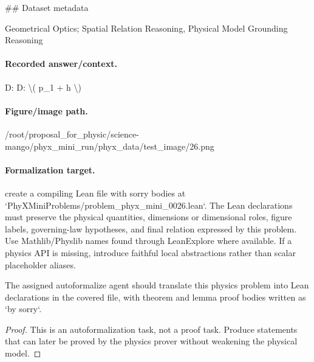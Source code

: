 \#\# Dataset metadata

Geometrical Optics; Spatial Relation Reasoning, Physical Model Grounding Reasoning

\paragraph{Recorded answer/context.}
D: D: \textbackslash{}( p\_1 + h \textbackslash{})

\paragraph{Figure/image path.}
/root/proposal\_for\_physic/science-mango/phyx\_mini\_run/phyx\_data/test\_image/26.png

\paragraph{Formalization target.}
create a compiling Lean file with sorry bodies at `PhyXMiniProblems/problem\_phyx\_mini\_0026.lean`. The Lean declarations must preserve the physical quantities, dimensions or dimensional roles, figure labels, governing-law hypotheses, and final relation expressed by this problem.
Use Mathlib/Physlib names found through LeanExplore where available. If a physics API is missing, introduce faithful local abstractions rather than scalar placeholder aliases.

\begin{theorem}
\label{thm:physics:phyx_mini_0026:target}
The assigned autoformalize agent should translate this physics problem into Lean declarations in the covered file, with theorem and lemma proof bodies written as `by sorry`.
\end{theorem}
\begin{proof}
This is an autoformalization task, not a proof task. Produce statements that can later be proved by the physics prover without weakening the physical model.
\end{proof}

